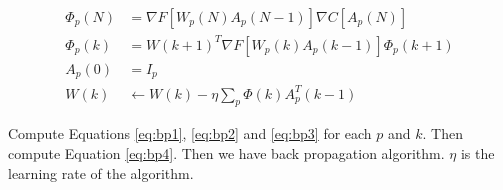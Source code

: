 \documentclass[10pt]{article}
\begin{document}
\begin{align}
	\Phi_p(N) &= \nabla F\left[W_p(N)A_p(N-1)\right]  \nabla C\left[A_p(N)\right] \label{eq:bp1}\\
	\Phi_p(k) &= W(k+1)^T \nabla F\left[W_p(k)A_p(k-1)\right]  \Phi_p(k+1) \label{eq:bp2}\\ 
	A_p(0) &=I_p \label{eq:bp3}\\
	W(k) &\gets W(k) - \eta \sum_p \Phi(k)  A_p^T(k-1) \label{eq:bp4}
\end{align}

Compute  Equations \ref{eq:bp1},  \ref{eq:bp2} and \ref{eq:bp3} for each $p$ and $k$. Then compute Equation  \ref{eq:bp4}. Then we have back propagation algorithm. $\eta$ is the learning rate of the algorithm.

\printbibliography
\end{document}
